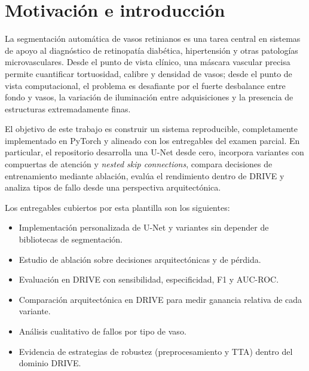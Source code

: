 \section{Motivación e introducción}
La segmentación automática de vasos retinianos es una tarea central en sistemas de apoyo al diagnóstico de retinopatía diabética, hipertensión y otras patologías microvasculares. Desde el punto de vista clínico, una máscara vascular precisa permite cuantificar tortuosidad, calibre y densidad de vasos; desde el punto de vista computacional, el problema es desafiante por el fuerte desbalance entre fondo y vasos, la variación de iluminación entre adquisiciones y la presencia de estructuras extremadamente finas.

El objetivo de este trabajo es construir un sistema reproducible, completamente implementado en PyTorch y alineado con los entregables del examen parcial. En particular, el repositorio desarrolla una U-Net desde cero, incorpora variantes con compuertas de atención y \emph{nested skip connections}, compara decisiones de entrenamiento mediante ablación, evalúa el rendimiento dentro de DRIVE y analiza tipos de fallo desde una perspectiva arquitectónica.

Los entregables cubiertos por esta plantilla son los siguientes:
\begin{itemize}
    \item Implementación personalizada de U-Net y variantes sin depender de bibliotecas de segmentación.
    \item Estudio de ablación sobre decisiones arquitectónicas y de pérdida.
    \item Evaluación en DRIVE con sensibilidad, especificidad, F1 y AUC-ROC.
    \item Comparación arquitectónica en DRIVE para medir ganancia relativa de cada variante.
    \item Análisis cualitativo de fallos por tipo de vaso.
    \item Evidencia de estrategias de robustez (preprocesamiento y TTA) dentro del dominio DRIVE.
\end{itemize}
